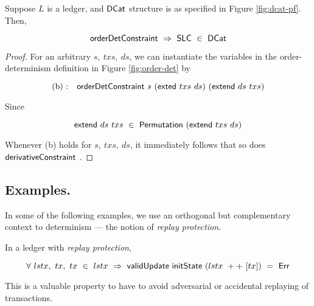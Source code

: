 \begin{theorem}
  Suppose $L$ is a ledger, and $\mathsf{DCat}$ structure is as specified in Figure \ref{fig:dcat-pf}.
  Then,

  \[ \mathsf{orderDetConstraint} ~\Rightarrow~\mathsf{SLC}~\in~\mathsf{DCat} \]

  \label{theo:dcat-pf}
\end{theorem}

\begin{proof}
  For an arbitrary $s,~txs,~ds$, we can instantiate the variables in the
  order-determinism definition in Figure \ref{fig:order-det} by

  \[ \text{(b)~:~~~}\mathsf{orderDetConstraint}~s~(\mathsf{exted}~txs~ds)~(\mathsf{extend}~ds~txs) \]

  Since

  \[ \mathsf{extend}~ds~txs~\in~\mathsf{Permutation}~(\mathsf{extend}~txs~ds) \]

  Whenever (b) holds for $s,~txs,~ds$, it immediately follows that so does $\mathsf{derivativeConstraint}$ .
\end{proof}

\subsection{Examples.~}
\label{sec:det-examples}


In some of the following examples, we use an orthogonal but complementary context
to determinism --- the notion of \emph{replay protection}.

\begin{definition}
  In a ledger with \emph{replay protection},

  \[ \forall~lstx,~tx,~tx~\in~lstx ~ \Rightarrow~\mathsf{validUpdate}~\mathsf{initState}~(lstx~++~[tx])~=~\mathsf{Err} \]
\end{definition}

This is a valuable property to have to avoid adversarial or accidental replaying of transactions.

